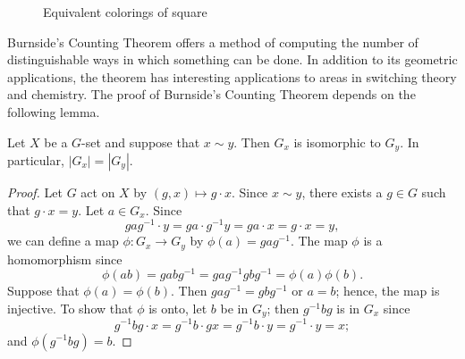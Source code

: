 \begin{figure}[htb]

\begin{center}
\end{center}
\caption{Equivalent colorings of square}
\label{colorings}
\end{figure}
 
 
Burnside's Counting Theorem offers a method of computing the number of
distinguishable ways in which something can be done. In addition to
its geometric applications, the theorem has interesting applications
to areas in switching theory and chemistry. The proof of Burnside's
Counting Theorem depends on the following lemma.
 
 
\begin{lemma}\label{Gset_lemma}
Let $X$ be a $G$-set and suppose that $x \sim y$. Then $G_x$ is
isomorphic to $G_y$.  In particular, $|G_x| = |G_y|$. 
\end{lemma}
 
 

\begin{proof}
Let $G$ act on $X$ by $(g,x) \mapsto g \cdot x$. Since $x \sim y$,
there exists a $g \in G$ such that $g \cdot x=y$. Let $a \in G_x$.
Since 
\[
gag^{-1} \cdot y = ga \cdot g^{-1}y = ga \cdot x = g \cdot
x = y,
\]
we can define a map $\phi: G_x \rightarrow G_y$ by $\phi(a) =
gag^{-1}$. The map $\phi$ is a homomorphism since 
\[
\phi(ab) = gabg^{-1} = gag^{-1} gbg^{-1} = \phi(a) \phi(b).
\]
Suppose that $\phi(a) = \phi(b)$. Then $gag^{-1}= gbg^{-1}$ or $a=b$;
hence, the map is injective.  To show that $\phi$ is onto, let $b$ be
in $G_y$; then $g^{-1}bg$ is in $G_x$ since
\[
g^{-1}bg \cdot x = g^{-1}b \cdot gx = g^{-1}b \cdot y = g^{-1} \cdot y
= x; 
\]
and $\phi(g^{-1}bg ) = b$.
\end{proof}
 
